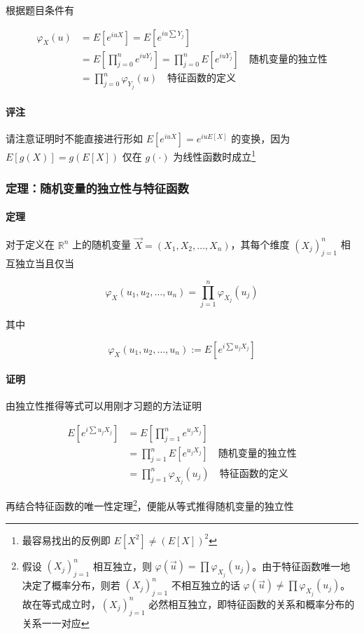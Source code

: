 \documentclass[a4paper, 11pt]{article} %
\begin{document}
根据题目条件有

\begin{align*}
\varphi_X(u)&=E[e^{iuX}] =E[e^{iu\sum Y_j}]  \\
&=E[\prod\limits_{j=0}^n e^{iuY_j}] =\prod\limits_{j=0}^n E[e^{iuY_j}] \quad \text{随机变量的独立性} \\
&=\prod\limits_{j=0}^n\varphi_{Y_j}(u) \quad \text{特征函数的定义}
\end{align*}

\paragraph{评注}

请注意证明时不能直接进行形如 $E[e^{iuX}]=e^{iuE[X]}$ 的变换，因为 $E[g(X)]=g(E[X])$ 仅在 $g(\cdot)$ 为线性函数时成立\footnote{最容易找出的反例即 $E[X^2]\neq (E[X])^2$}

\subsubsection{定理：随机变量的独立性与特征函数}

\paragraph{定理}

对于定义在 $\mathbb{R}^n$ 上的随机变量 $\vec{X}=(X_1,X_2,\dots,X_n)$，其每个维度 $(X_j)_{j=1}^n$ 相互独立当且仅当 

$$
\varphi_X(u_1,u_2,\dots,u_n)=\prod\limits_{j=1}^n\varphi_{X_j}(u_j)
$$

其中

$$
\varphi_X(u_1,u_2,\dots,u_n):=E[e^{i\sum u_jX_j}]
$$

\paragraph{证明}

由独立性推得等式可以用刚才习题的方法证明

\begin{align*}
E[e^{i\sum u_jX_j}]&=E[\prod\limits_{j=1}^n e^{u_jX_j}] \\
&= \prod\limits_{j=1}^n E[e^{u_jX_j}] \quad \text{随机变量的独立性} \\
&= \prod\limits_{j=1}^n\varphi_{X_j}(u_j) \quad\text{特征函数的定义}	
\end{align*}

再结合特征函数的唯一性定理\footnote{假设 $(X_j)_{j=1}^n$ 相互独立，则 $\varphi(\vec{u})=\prod\varphi_{X_j}(u_j)$。由于特征函数唯一地决定了概率分布，则若 $(X_j)_{j=1}^n$ 不相互独立的话 $\varphi(\vec{u})\neq\prod\varphi_{X_j}(u_j)$。故在等式成立时，$(X_j)_{j=1}^n$ 必然相互独立，即特征函数的关系和概率分布的关系一一对应}，便能从等式推得随机变量的独立性
\end{document}
